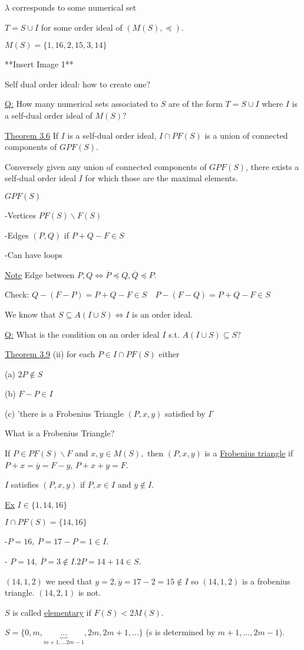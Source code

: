 \documentclass[11pt]{article}
\begin{document}
$\lambda$ corresponds to some numerical set 

$T = S \cup I$ for some order ideal of $(M(S),\preceq)$. 

$M(S) = \{1, 16, 2, 15, 3, 14 \}$

**Insert Image 1**

Self dual order ideal: how to create one? 

\underline{Q:} How many numerical sets associated to $S$ are of the form $T= S \cup I$ where $I $ is a self-dual order ideal of $M(S)?$

\underline{Theorem 3.6}
If $I$ is a self-dual order ideal, $I \cap PF(S)$ is a union of connected components of $GPF(S)$. 

Conversely given any union of connected components of $GPF(S)$, there exists a self-dual order ideal $I$ for which those are the maximal elements. 

$GPF(S)$

-Vertices $PF(S) \backslash F(S)$

-Edges $(P,Q)$ if $P+Q - F \in S$

-Can have loops

\underline{Note} Edge between $P, Q \iff \overline{P} \preceq Q, \overline{Q} \preceq P$. 

Check: $Q-(F-P) = P + Q - F \in S \quad P - (F-Q) = P+ Q - F \in S$

We know that $S \subseteq A(I \cup S) \iff I$ is an order ideal. 

\underline{Q:} What is the condition on an order ideal $I$ s.t. $A(I \cup S ) \subseteq S$?

\underline{Theorem 3.9} (ii) for each $P \in I \cap PF(S)$ either 

(a) $2 P \not \in S$

(b) $F-P \in I$

(c) 'there is a Frobenius Triangle $(P,x,y)$ satisfied by $I$'

What is a Frobenius Triangle? 

If $P \in PF(S) \backslash F$ and $x,y \in M(S),$ then $(P,x,y)$ is a \underline{Frobenius triangle} if $P + x = \overline{y} = F -y$, $P+x+y = F$. 

$I$ satisfies $(P,x,y)$ if $P, x \in I$ and $\overline{y} \not \in I.$

\underline{Ex} $I \in \{1, 14, 16\}$

$I \cap PF(S) = \{14,16 \}$

-$P=16, \ \overline{P} = 17 - P = 1 \in I$. 

- $P = 14, \ \overline{P} = 3 \not \in I. 2P = 14 + 14 \in S$. 

$(14, 1, 2)$ we need that $y=2, \overline{y} = 17 -2 =15 \not \in I$ so $(14, 1, 2)$ is a frobenius triangle. $(14,2,1)$ is not. 

$S$ is called \underline{elementary} if $F(S) < 2M(S)$. 

$S = \{ 0 , m , \underbrace{\dots}_{m+1, \dots 2m-1}, 2m, 2m+1, \dots \}$
(s is determined by $m+1, \dots , 2m-1$). 
\end{document}
